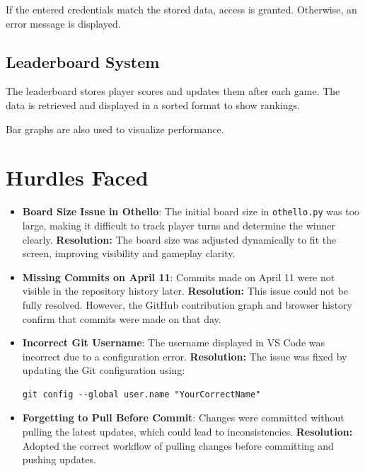 \documentclass{article}
\begin{document}
If the entered credentials match the stored data, access is granted. Otherwise, an error message is displayed.

\subsection{Leaderboard System}

The leaderboard stores player scores and updates them after each game. The data is retrieved and displayed in a sorted format to show rankings.

Bar graphs are also used to visualize performance.

\section{Hurdles Faced}

\begin{itemize}

\item \textbf{Board Size Issue in Othello}: The initial board size in \texttt{othello.py} was too large, making it difficult to track player turns and determine the winner clearly.
\textbf{Resolution:} The board size was adjusted dynamically to fit the screen, improving visibility and gameplay clarity.

\item \textbf{Missing Commits on April 11}: Commits made on April 11 were not visible in the repository history later.
\textbf{Resolution:} This issue could not be fully resolved. However, the GitHub contribution graph and browser history confirm that commits were made on that day.

\item \textbf{Incorrect Git Username}: The username displayed in VS Code was incorrect due to a configuration error.
\textbf{Resolution:} The issue was fixed by updating the Git configuration using:
\begin{verbatim}
git config --global user.name "YourCorrectName"
\end{verbatim}

\item \textbf{Forgetting to Pull Before Commit}: Changes were committed without pulling the latest updates, which could lead to inconsistencies.
\textbf{Resolution:} Adopted the correct workflow of pulling changes before committing and pushing updates.

\end{itemize}
\end{document}
